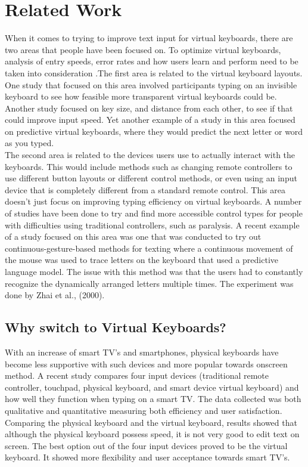\documentclass{vgtc}                          %
\begin{document}
\section{Related Work}

When it comes to trying to improve text input for virtual keyboards, there are two areas that people have been focused on. To optimize virtual keyboards, analysis of entry speeds, error rates and how users learn and perform need to be taken into consideration \cite{27}.The first area is related to the virtual keyboard layouts. One study that focused on this area involved participants typing on an invisible keyboard to see how feasible more transparent virtual keyboards could be\cite{32}. Another study focused on key size, and distance from each other, to see if that could improve input speed\cite{34}. Yet another example of a study in this area focused on predictive virtual keyboards, where they would predict the next letter or word as you typed\cite{25}.\\[1em]
The second area is related to the devices users use to actually interact with the keyboards. This would include methods such as changing remote controllers to use different button layouts or different control methods, or even using an input device that is completely different from a standard remote control. This area doesn’t just focus on improving typing efficiency on virtual keyboards. A number of studies have been done to try and find more accessible control types for people with difficulties using traditional controllers, such as paralysis. A recent example of a study focused on this area was one that was conducted to try out continuous-gesture-based methods for texting where a continuous movement of the mouse was used to trace letters on the keyboard that used a predictive language model. The issue with this method was that the users had to constantly recognize the dynamically arranged letters multiple times\cite{Zhai:2002}. The experiment was done by Zhai et al., (2000).


\subsection{Why switch to Virtual Keyboards?}

With an increase of smart TV’s and smartphones, physical keyboards have become less supportive with such devices and more popular towards onscreen method\cite{13}. A recent study compares four input devices (traditional remote controller, touchpad, physical keyboard, and smart device virtual keyboard) and how well they function when typing on a smart TV. The data collected was both qualitative and quantitative measuring both efficiency and user satisfaction\cite{li:2015}. Comparing the physical keyboard and the virtual keyboard, results showed that although the physical keyboard possess speed, it is not very good to edit text on screen. The best option out of the four input devices proved to be the virtual keyboard. It showed more flexibility and user acceptance towards smart TV’s\cite{li:2015}. 
\end{document}
